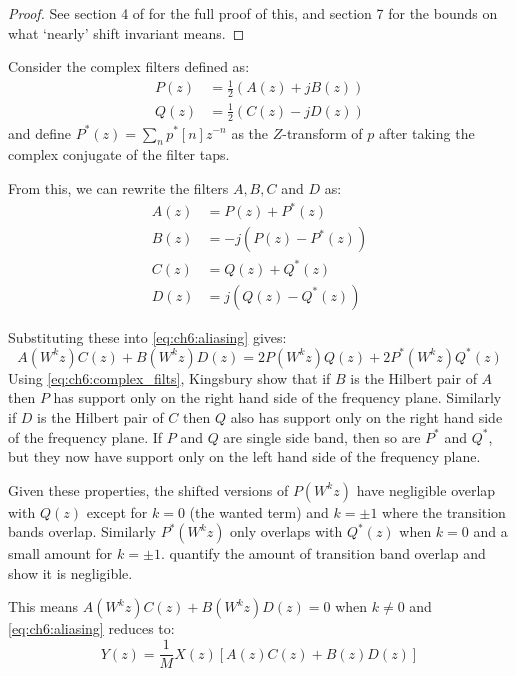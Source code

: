 \begin{proof}
  See section 4 of \cite{kingsbury_complex_2001} for the full proof of
  this, and section 7 for the bounds on what `nearly' shift invariant means. 
\end{proof}

Consider the complex filters defined as:
\begin{align}
  P(z) &= \frac{1}{2}\left(A(z) + jB(z)\right) \\
  Q(z) &= \frac{1}{2}\left(C(z) - jD(z)\right)
\end{align}
and define $P^*(z) = \sum_{n} p^{*}[n] z^{-n}$ as the $Z$-transform of $p$
after taking the complex conjugate of the filter taps. 

From this, we can rewrite the filters $A, B, C$ and $D$ as:
\begin{align}
  A(z) &= P(z) + P^*(z) \\
  B(z) &= -j(P(z) - P^*(z)) \\
  C(z) &= Q(z) + Q^*(z) \\
  D(z) &= j(Q(z) - Q^*(z))
\end{align}

Substituting these into \eqref{eq:ch6:aliasing} gives:
\begin{equation}
  A(W^k z)C(z) + B(W^k z)D(z) = 2P(W^kz)Q(z) + 2P^*(W^kz)Q^*(z) \label{eq:ch6:complex_filts}
\end{equation}
Using \eqref{eq:ch6:complex_filts}, Kingsbury show that if $B$ is the Hilbert pair
of $A$ then $P$ has support only on the right hand side of the frequency plane.
Similarly if $D$ is the Hilbert pair of $C$ then $Q$ also has support only on
the right hand side of the frequency plane. If $P$ and $Q$ are single side band,
then so are $P^*$ and $Q^*$, but they now have support only on the left hand
side of the frequency plane. 

Given these properties, the shifted versions of $P(W^k z)$ have negligible overlap
with $Q(z)$ except for $k=0$ (the wanted term) and $k=\pm 1$ where the
transition bands overlap. Similarly $P^*(W^k z)$ only overlaps with $Q^*(z)$ 
when $k=0$ and a small amount for $k = \pm 1$. \cite{kingsbury_complex_2001}
quantify the amount of transition band overlap and show it is negligible.

This means $A(W^k z)C(z) + B(W^k z)D(z) = 0$ when $k\neq 0$ and 
\eqref{eq:ch6:aliasing} reduces to:
\begin{equation}
  Y(z) =  \frac{1}{M} X(z)\left[ A(z)C(z) + B(z)D(z) \right]
  \label{eq:ch6:aliasing_cancel} 
\end{equation}

